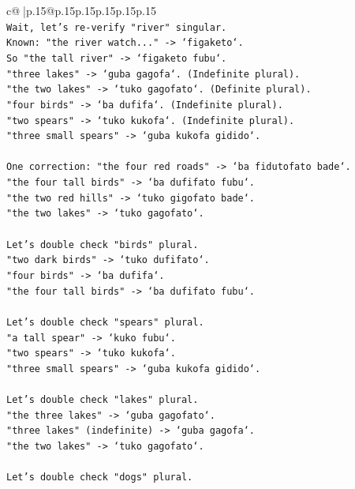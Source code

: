 \documentclass{article}
\begin{document}
{\begin{supertabular}{c@{$\;$}|p{.15\linewidth}@{}p{.15\linewidth}p{.15\linewidth}p{.15\linewidth}p{.15\linewidth}p{.15\linewidth}}
{{{\\ 
\texttt{Wait, let's re{-}verify "river" singular.} \\
\texttt{Known: "the river watch..." {-}> `figaketo`.} \\
\texttt{So "the tall river" {-}> `figaketo fubu`.} \\
\texttt{"three lakes" {-}> `guba gagofa`. (Indefinite plural).} \\
\texttt{"the two lakes" {-}> `tuko gagofato`. (Definite plural).} \\
\texttt{"four birds" {-}> `ba dufifa`. (Indefinite plural).} \\
\texttt{"two spears" {-}> `tuko kukofa`. (Indefinite plural).} \\
\texttt{"three small spears" {-}> `guba kukofa gidido`.} \\
\\ 
\texttt{One correction: "the four red roads" {-}> `ba fidutofato bade`.} \\
\texttt{"the four tall birds" {-}> `ba dufifato fubu`.} \\
\texttt{"the two red hills" {-}> `tuko gigofato bade`.} \\
\texttt{"the two lakes" {-}> `tuko gagofato`.} \\
\\ 
\texttt{Let's double check "birds" plural.} \\
\texttt{"two dark birds" {-}> `tuko dufifato`.} \\
\texttt{"four birds" {-}> `ba dufifa`.} \\
\texttt{"the four tall birds" {-}> `ba dufifato fubu`.} \\
\\ 
\texttt{Let's double check "spears" plural.} \\
\texttt{"a tall spear" {-}> `kuko fubu`.} \\
\texttt{"two spears" {-}> `tuko kukofa`.} \\
\texttt{"three small spears" {-}> `guba kukofa gidido`.} \\
\\ 
\texttt{Let's double check "lakes" plural.} \\
\texttt{"the three lakes" {-}> `guba gagofato`.} \\
\texttt{"three lakes" (indefinite) {-}> `guba gagofa`.} \\
\texttt{"the two lakes" {-}> `tuko gagofato`.} \\
\\ 
\texttt{Let's double check "dogs" plural.} \\
}}}
\end{supertabular}}
\end{document}

